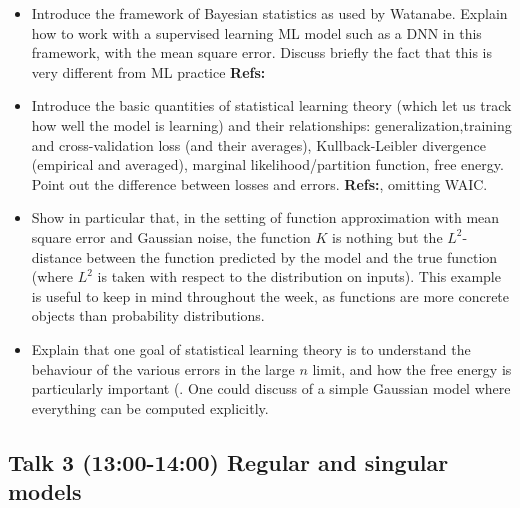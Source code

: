 \documentclass[a4paper,11pt]{amsart}
\begin{document}
\begin{itemize}
\item Introduce the framework of Bayesian statistics as used by Watanabe. Explain how to work with a supervised learning ML model such as a DNN in this framework, with the mean square error. Discuss briefly the fact that this is very different from ML practice
\textbf{Refs:} \cite[\S 1.1-1.4]{green-book}
\item Introduce the basic quantities of statistical learning theory (which let us track how well the model is learning) and their relationships: generalization,training and cross-validation loss (and their averages), Kullback-Leibler divergence (empirical and averaged), marginal likelihood/partition function, free energy. Point out the difference between losses and errors. \textbf{Refs:}\cite[\S 1.6-1.7]{green-book}, omitting WAIC.
\item Show in particular that, in the setting of function approximation with mean square error and Gaussian noise, the function $K$ is nothing but the $L^{2}$-distance between the function predicted by the model and the true function (where $L^{2}$ is taken with respect to the distribution on inputs). This example is useful to keep in mind throughout the week, as functions are more concrete objects than probability distributions.
\item Explain that one goal of statistical learning theory is to understand the behaviour of the various errors in the large $n$ limit, and how the free energy is particularly important (\cite[Rmk 10 in \S 1.7]{green-book}. One could discuss \cite[Example 1.9.4]{green-book} of a simple Gaussian model where everything can be computed explicitly.
\end{itemize}

\subsection*{Talk 3 (13:00-14:00) Regular and singular models}
\end{document}
